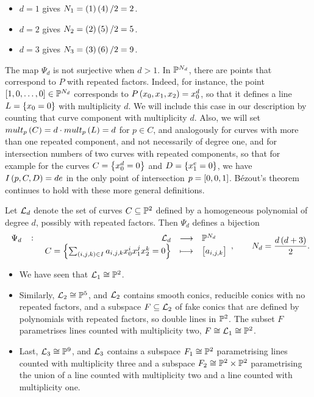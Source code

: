 \pagebreak

\begin{example*}
\hfill
\begin{itemize}
\item $ d = 1 $ gives $ N_1 = \br{1}\br{4} / 2 = 2 $.
\item $ d = 2 $ gives $ N_2 = \br{2}\br{5} / 2 = 5 $.
\item $ d = 3 $ gives $ N_3 = \br{3}\br{6} / 2 = 9 $.
\end{itemize}
\end{example*}

\begin{remark}
The map $ \Psi_d $ is not surjective when $ d > 1 $. In $ \P^{N_d} $, there are points that correspond to $ P $ with repeated factors. Indeed, for instance, the point $ \sbr{1, 0, \dots, 0} \in \P^{N_d} $ corresponds to $ P\br{x_0, x_1, x_2} = x_0^d $, so that it defines a line $ L = \cbr{x_0 = 0} $ with multiplicity $ d $. We will include this case in our description by counting that curve component with multiplicity $ d $. Also, we will set $ mult_p\br{C} = d \cdot mult_p\br{L} = d $ for $ p \in C $, and analogously for curves with more than one repeated component, and not necessarily of degree one, and for intersection numbers of two curves with repeated components, so that for example for the curves $ C = \cbr{x_0^d = 0} $ and $ D = \cbr{x_1^e = 0} $, we have $ I\br{p, C, D} = de $ in the only point of intersection $ p = \sbr{0, 0, 1} $. B\'ezout's theorem continues to hold with these more general definitions.
\end{remark}

\begin{definition}
Let $ \LL_d $ denote the set of curves $ C \subseteq \P^2 $ defined by a homogeneous polynomial of degree $ d $, possibly with repeated factors. Then $ \Psi_d $ defines a bijection
$$ \function[\Psi_d]{\LL_d}{\P^{N_d}}{C = \cbr{\sum_{\br{i, j, k} \in I} a_{i, j, k}x_0^ix_1^jx_2^k = 0}}{\sbr{a_{i, j, k}}}, \qquad N_d = \dfrac{d\br{d + 3}}{2}. $$
\end{definition}

\begin{example}
\hfill
\begin{itemize}
\item We have seen that $ \LL_1 \cong \P^2 $.
\item Similarly, $ \LL_2 \cong \P^5 $, and $ \LL_2 $ contains smooth conics, reducible conics with no repeated factors, and a subspace $ F \subseteq \LL_2 $ of fake conics that are defined by polynomials with repeated factors, so double lines in $ \P^2 $. The subset $ F $ parametrises lines counted with multiplicity two, $ F \cong \LL_1 \cong \P^2 $.
\item Last, $ \LL_3 \cong \P^9 $, and $ \LL_3 $ contains a subspace $ F_1 \cong \P^2 $ parametrising lines counted with multiplicity three and a subspace $ F_2 \cong \P^2 \times \P^2 $ parametrising the union of a line counted with multiplicity two and a line counted with multiplicity one.
\end{itemize}
\end{example}

